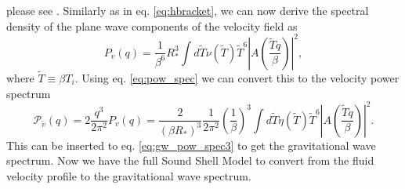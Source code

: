 please see \cite[section 4.2]{hindmarsh_gw_pt_2019}.
Similarly as in eq. \eqref{eq:hbracket}, we can now derive the spectral density of the plane wave components of the velocity field as
\cite[eq. 4.17]{hindmarsh_gw_pt_2019}
\begin{equation}
P_v(q) = \frac{1}{\beta^6}{R_*^3} \int d\tilde{T} \nu(\tilde{T}) \tilde{T}^6 |A(\frac{\tilde{T}q}{\beta})|^2,
\label{eq:spec_den_v}
\end{equation}
where $\tilde{T} \equiv \beta T_i$.
Using eq. \eqref{eq:pow_spec} we can convert this to the velocity power spectrum
\cite[eq. 4.18]{hindmarsh_gw_pt_2019}
\begin{equation}
\mathcal{P}_{\tilde{v}}(q)
= 2 \frac{q^3}{2\pi^2} P_v(q)
= \frac{2}{(\beta R_*)^3} \frac{1}{2\pi^2} \left(\frac{1}{\beta}\right)^3
\int d \tilde{T} \eta(\tilde{T}) \tilde{T}^6 \left| A \left( \frac{\tilde{T} q}{\beta} \right) \right|^2.
\label{eq:pow_v}
\end{equation}
This can be inserted to eq. \ref{eq:gw_pow_spec3} to get the gravitational wave spectrum.
Now we have the full Sound Shell Model to convert from the fluid velocity profile to the gravitational wave spectrum.

